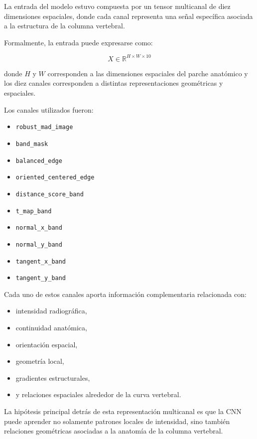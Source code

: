 \documentclass[conference]{IEEEtran}
\begin{document}
La entrada del modelo estuvo compuesta por un tensor multicanal de diez dimensiones espaciales, donde cada canal representa una señal específica asociada a la estructura de la columna vertebral.

Formalmente, la entrada puede expresarse como:

\[
X \in \mathbb{R}^{H \times W \times 10}
\]

donde $H$ y $W$ corresponden a las dimensiones espaciales del parche anatómico y los diez canales corresponden a distintas representaciones geométricas y espaciales.

Los canales utilizados fueron:

\begin{itemize}
    \item \texttt{robust\_mad\_image}
    \item \texttt{band\_mask}
    \item \texttt{balanced\_edge}
    \item \texttt{oriented\_centered\_edge}
    \item \texttt{distance\_score\_band}
    \item \texttt{t\_map\_band}
    \item \texttt{normal\_x\_band}
    \item \texttt{normal\_y\_band}
    \item \texttt{tangent\_x\_band}
    \item \texttt{tangent\_y\_band}
\end{itemize}

Cada uno de estos canales aporta información complementaria relacionada con:

\begin{itemize}
    \item intensidad radiográfica,
    \item continuidad anatómica,
    \item orientación espacial,
    \item geometría local,
    \item gradientes estructurales,
    \item y relaciones espaciales alrededor de la curva vertebral.
\end{itemize}

La hipótesis principal detrás de esta representación multicanal es que la CNN puede aprender no solamente patrones locales de intensidad, sino también relaciones geométricas asociadas a la anatomía de la columna vertebral.
\end{document}
